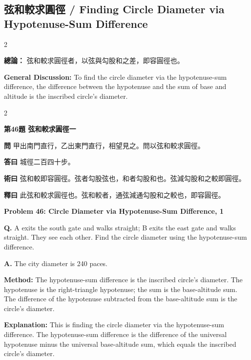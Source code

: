 \documentclass[11pt,a4paper]{article}
\newcommand{\wen}[1]{\noindent\textbf{問} #1\par\smallskip}
\newcommand{\da}[1]{\noindent\textbf{答曰} #1\par\smallskip}
\newcommand{\shu}[1]{\noindent\textbf{術曰} #1\par\smallskip}
\newcommand{\shi}[1]{\noindent\textbf{釋曰} #1\par\smallskip}
\newcommand{\wenE}[1]{\noindent\textbf{Q.} #1\par\smallskip}
\newcommand{\daE}[1]{\noindent\textbf{A.} #1\par\smallskip}
\newcommand{\shuE}[1]{\noindent\textbf{Method:} #1\par\smallskip}
\newcommand{\shiE}[1]{\noindent\textbf{Explanation:} #1\par\smallskip}
\begin{document}
\clearpage

\subsection*{弦和較求圓徑 / Finding Circle Diameter via Hypotenuse-Sum Difference}

\begin{paracol}{2}

\noindent\textbf{總論：} 弦和較求圓徑者，以弦與勾股和之差，即容圓徑也。

\switchcolumn

\noindent\textbf{General Discussion:} To find the circle diameter via the hypotenuse-sum difference, the difference between the hypotenuse and the sum of base and altitude is the inscribed circle's diameter.

\end{paracol}

\bigskip

\begin{paracol}{2}

\noindent\textbf{第46題 弦和較求圓徑一}

\wen{甲出南門直行，乙出東門直行，相望見之。問以弦和較求圓徑。}
\da{城徑二百四十步。}
\shu{弦和較即容圓徑。弦者勾股弦也，和者勾股和也。弦減勾股和之較即圓徑。}
\shi{此弦和較求圓徑也。弦和較者，通弦減通勾股和之較也，即容圓徑。}

\switchcolumn

\noindent\textbf{Problem 46: Circle Diameter via Hypotenuse-Sum Difference, 1}

\wenE{A exits the south gate and walks straight; B exits the east gate and walks straight. They see each other. Find the circle diameter using the hypotenuse-sum difference.}
\daE{The city diameter is 240 paces.}
\shuE{The hypotenuse-sum difference is the inscribed circle's diameter. The hypotenuse is the right-triangle hypotenuse; the sum is the base-altitude sum. The difference of the hypotenuse subtracted from the base-altitude sum is the circle's diameter.}
\shiE{This is finding the circle diameter via the hypotenuse-sum difference. The hypotenuse-sum difference is the difference of the universal hypotenuse minus the universal base-altitude sum, which equals the inscribed circle's diameter.}

\end{paracol}
\end{document}
